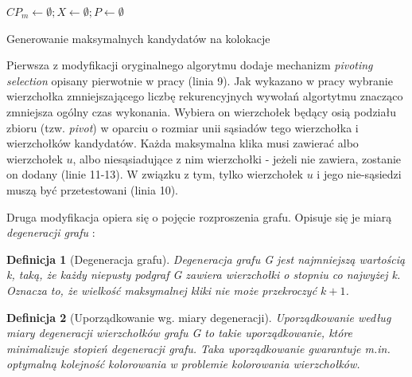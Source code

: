 \documentclass[12pt]{article}
\makeatletter
\newtheorem{defin}{Definicja}
\newcounter{algorytm}
\newenvironment{algorytm}[1][htb]
  {
  \renewcommand*{\algorithmcfname}{Algorytm}%
  \let\c@algocf\c@algorytm
   \begin{algorithm}[#1]
  }
  {\end{algorithm}}
\makeatother
\begin{document}
\begin{algorytm}

$CP_{m} \leftarrow \emptyset; X \leftarrow \emptyset; P \leftarrow \emptyset$\;

\caption{Generowanie maksymalnych kandydatów na kolokacje}
\label{alg:chinczyki_step3}
\end{algorytm}

Pierwsza z modyfikacji oryginalnego algorytmu dodaje mechanizm \textit{pivoting selection} opisany pierwotnie w pracy \cite{pivot} (linia 9). Jak wykazano w pracy \cite{pivot2} wybranie wierzchołka zmniejszającego liczbę rekurencyjnych wywołań algortytmu znacząco zmniejsza ogólny czas wykonania. Wybiera on wierzchołek będący osią podziału zbioru (tzw. \textit{pivot}) w oparciu o rozmiar unii sąsiadów tego wierzchołka i wierzchołków kandydatów. Każda maksymalna klika musi zawierać albo wierzchołek $ u $, albo niesąsiadujące z nim wierzchołki - jeżeli nie zawiera, zostanie on dodany (linie 11-13). W związku z tym, tylko wierzchołek $ u $ i jego nie-sąsiedzi muszą być przetestowani (linia 10).

Druga modyfikacja opiera się o pojęcie rozproszenia grafu. Opisuje się je miarą \textit{degeneracji grafu} \cite{matusiak}:
\begin{defin}[Degeneracja grafu]
Degeneracja grafu G jest najmniejszą wartością k, taką, że każdy niepusty podgraf G zawiera wierzchołki o stopniu co najwyżej k. Oznacza to, że wielkość maksymalnej kliki nie może przekroczyć $k + 1$.
\label{def:degeneracy}
\end{defin}

\begin{defin}[Uporządkowanie wg. miary degeneracji]
Uporządkowanie według miary degeneracji wierzchołków grafu G to takie uporządkowanie, które minimalizuje stopień degeneracji grafu. Taka uporządkowanie gwarantuje m.in. optymalną kolejność kolorowania w problemie kolorowania wierzchołków.
\end{defin}
\end{document}

